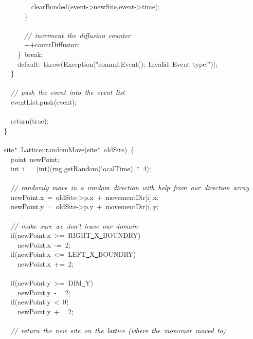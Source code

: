 {\ \ \ \ \ \ \ \ clearBonded(event-{}>{}newSite,event-{}>{}time);\\
\ \ \ \ \ \ \}\\
\ \\
\ \ \ \ \ \ \textsl{//\ incriment\ the\ diffusion\ counter}\\
\ \ \ \ \ \ ++countDiffusion;\\
\ \ \ \ \}\ break;\\
\ \ \ \ default:\ throw(Exception("{}commitEvent():\ Invalid\ Event\ type!"{}));\\
\ \ \}\\
\ \\
\ \ \textsl{//\ push\ the\ event\ into\ the\ event\ list}\\
\ \ eventList.push(event);\\
\ \\
\ \ return(true);\\
\}\\
\ \\
site$\ast$\ Lattice::randomMove(site$\ast$\ oldSite)\ \{\\
\ \ point\ newPoint;\\
\ \ int\ i\ =\ (int)(rng.getRandom(localTime)\ $\ast$\ 4);\\
\ \\
\ \ \textsl{//\ randomly\ move\ in\ a\ random\ direction\ with\ help\ from\ our\ direction\ array}\\
\ \ newPoint.x\ =\ oldSite-{}>{}p.x\ +\ movementDir[i].x;\\
\ \ newPoint.y\ =\ oldSite-{}>{}p.y\ +\ movementDir[i].y;\\
\ \\
\ \ \textsl{//\ make\ sure\ we\ don't\ leave\ our\ domain}\\
\ \ if(newPoint.x\ >{}=\ RIGHT\underline\ X\underline\ BOUNDRY)\\
\ \ \ \ newPoint.x\ -{}=\ 2;\\
\ \ if(newPoint.x\ <{}=\ LEFT\underline\ X\underline\ BOUNDRY)\\
\ \ \ \ newPoint.x\ +=\ 2;\\
\ \\
\ \ if(newPoint.y\ >{}=\ DIM\underline\ Y)\\
\ \ \ \ newPoint.y\ -{}=\ 2;\\
\ \ if(newPoint.y\ <{}\ 0)\\
\ \ \ \ newPoint.y\ +=\ 2;\\
\ \\
\ \ \textsl{//\ return\ the\ new\ site\ on\ the\ lattice\ (where\ the\ monomer\ moved\ to)}\\
}
